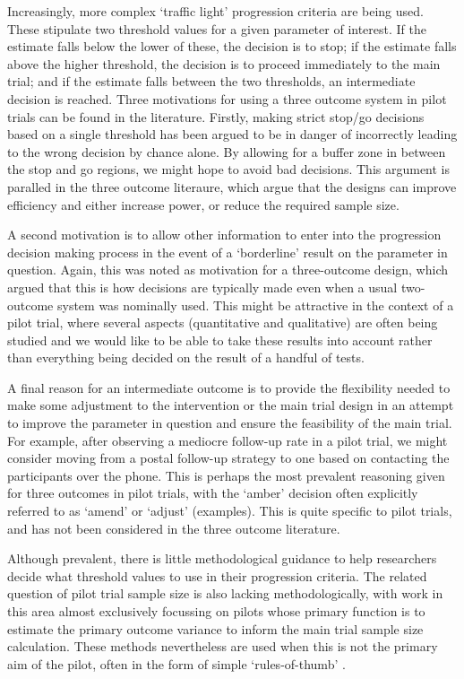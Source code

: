\documentclass[sagev, Crown]{sagej} %
\begin{document}
Increasingly, more complex `traffic light' progression criteria are being used. These stipulate two threshold values for a given parameter of interest. If the estimate falls below the lower of these, the decision is to stop; if the estimate falls above the higher threshold, the decision is to proceed immediately to the main trial; and if the estimate falls between the two thresholds, an intermediate decision is reached. Three motivations for using a three outcome system in pilot trials can be found in the literature. Firstly, making strict stop/go decisions based on a single threshold has been argued to be in danger of incorrectly leading to the wrong decision by chance alone. By allowing for a buffer zone in between the stop and go regions, we might hope to avoid bad decisions. This argument is paralled in the three outcome literaure, which argue that the designs can improve efficiency and either increase power, or reduce the required sample size.

A second motivation is to allow other information to enter into the progression decision making process in the event of a `borderline' result on the parameter in question. Again, this was noted as motivation for a three-outcome design, which argued that this is how decisions are typically made even when a usual two-outcome system was nominally used. This might be attractive in the context of a pilot trial, where several aspects (quantitative and qualitative) are often being studied and we would like to be able to take these results into account rather than everything being decided on the result of a handful of tests.

A final reason for an intermediate outcome is to provide the flexibility needed to make some adjustment to the intervention or the main trial design in an attempt to improve the parameter in question and ensure the feasibility of the main trial. For example, after observing a mediocre follow-up rate in a pilot trial, we might consider moving from a postal follow-up strategy to one based on contacting the participants over the phone. This is perhaps the most prevalent reasoning given for three outcomes in pilot trials, with the `amber' decision often explicitly referred to as `amend' or `adjust' (examples). This is quite specific to pilot trials, and has not been considered in the three outcome literature.

Although prevalent, there is little methodological guidance to help researchers decide what threshold values to use in their progression criteria. The related question of pilot trial sample size is also lacking methodologically, with work in this area almost exclusively focussing on pilots whose primary function is to estimate the primary outcome variance to inform the main trial sample size calculation. These methods nevertheless are used when this is not the primary aim of the pilot, often in the form of simple `rules-of-thumb' \cite{Browne1995} \cite{Teare2014} \cite{Whitehead2015}. 
\end{document}
